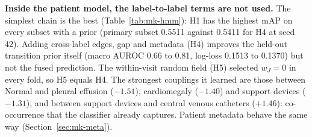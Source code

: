 \documentclass[conference]{IEEEtran}
\begin{document}
\textbf{Inside the patient model, the label-to-label terms are not used.} The simplest chain is the best (Table~\ref{tab:mk-hmm}): H1 has the highest mAP on every subset with a prior (primary subset 0.5511 against 0.5411 for H4 at seed 42). Adding cross-label edges, gap and metadata (H4) improves the held-out transition prior itself (macro AUROC 0.66 to 0.81, log-loss 0.1513 to 0.1370) but not the fused prediction. The within-visit random field (H5) selected $w_J = 0$ in every fold, so H5 equals H4. The strongest couplings it learned are those between Normal and pleural effusion ($-1.51$), cardiomegaly ($-1.40$) and support devices ($-1.31$), and between support devices and central venous catheters ($+1.46$): co-occurrence that the classifier already captures. Patient metadata behave the same way (Section~\ref{sec:mk-meta}).
\end{document}
